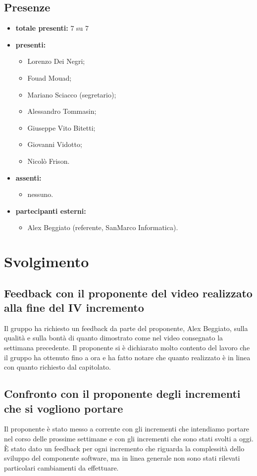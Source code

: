 \subsection*{Presenze}
	\begin{itemize}
		\item \textbf{totale presenti:} 7 su 7
		\item \textbf{presenti: }
			\begin{itemize}			
				\item Lorenzo Dei Negri;
				\item Fouad Mouad;
				\item Mariano Sciacco (segretario);
				\item Alessandro Tommasin;
				\item Giuseppe Vito Bitetti;
				\item Giovanni Vidotto;
				\item Nicolò Frison.
			\end{itemize}
		\item \textbf{assenti: } 
			\begin{itemize}	
				\item nessuno.
			\end{itemize}
		\item  \textbf{partecipanti esterni:}
			\begin{itemize}
				\item Alex Beggiato (referente, SanMarco Informatica).
			\end{itemize}
	\end{itemize}


\newpage
\section*{Svolgimento}

	\subsection*{Feedback con il proponente del video realizzato alla fine del IV incremento}
		Il gruppo ha richiesto un feedback da parte del proponente, Alex Beggiato, sulla qualità e sulla bontà di quanto dimostrato come  nel video consegnato la settimana precedente. Il proponente si è dichiarato molto contento del lavoro che il gruppo ha ottenuto fino a ora e ha fatto notare che quanto realizzato è in linea con quanto richiesto dal capitolato.

	\subsection*{Confronto con il proponente degli incrementi che si vogliono portare}
		Il proponente è stato messo a corrente con gli incrementi che intendiamo portare nel corso delle prossime settimane e con gli incrementi che sono stati svolti a oggi. È stato dato un feedback per ogni incremento che riguarda la complessità dello sviluppo del componente software, ma in linea generale non sono stati rilevati particolari cambiamenti da effettuare.

